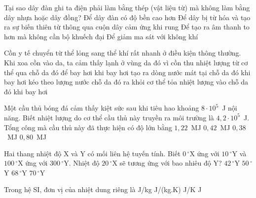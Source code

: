 	\begin{ex}%
		Tại sao dây đàn ghi ta điện phải làm bằng thép (vật liệu từ) mà không làm bằng dây nhựa hoặc dây đồng?
		\choice
		{Để dây đàn có độ bền cao hơn}
		{\True Để dây bị từ hóa và tạo ra sự biến thiên từ thông qua cuộn dây cảm ứng khi rung}
		{Để tạo ra âm thanh to hơn mà không cần bộ khuếch đại}
		{Để giảm ma sát với không khí}
	\end{ex}

	\begin{ex}%
		Cồn y tế chuyển từ thể lỏng sang thể khí rất nhanh ở điều kiện thông thường. Khi xoa cồn vào da, ta cảm thấy lạnh ở vùng da đó vì cồn
		\choice
		{\True thu nhiệt lượng từ cơ thể qua chỗ da đó để bay hơi}
		{khi bay hơi tạo ra dòng nước mát tại chỗ da đó}
		{khi bay hơi kéo theo lượng nước chỗ da đó ra khỏi cơ thể}
		{tỏa nhiệt lượng vào chỗ da đó khi bay hơi}
	\end{ex}

	\begin{ex}%
		Một cầu thủ bóng đá cảm thấy kiệt sức sau khi tiêu hao khoảng $8\cdot 10^5$~J nội năng. Biết nhiệt lượng do cơ thể cầu thủ này truyền ra môi trường là $4{,}2\cdot 10^5$~J. Tổng công mà cầu thủ này đã thực hiện có độ lớn bằng
		\choice
		{$1{,}22$~MJ}
		{$0{,}42$~MJ}
		{\True $0{,}38$~MJ}
		{$0{,}80$~MJ}
	\end{ex}

	\begin{ex}%
		Hai thang nhiệt độ X và Y có mối liên hệ tuyến tính. Biết $0\,^\circ$X ứng với $10\,^\circ$Y và $100\,^\circ$X ứng với $300\,^\circ$Y. Nhiệt độ $20\,^\circ$X sẽ tương ứng với bao nhiêu độ Y?
		\choice
		{$42\,^\circ$Y}
		{$50\,^\circ$Y}
		{\True $68\,^\circ$Y}
		{$70\,^\circ$Y}
	\end{ex}

	\begin{ex}%
		Trong hệ SI, đơn vị của nhiệt dung riêng là
		\choice
		{J/kg}
		{\True J/(kg.K)}
		{J/K}
		{J}
	\end{ex}

